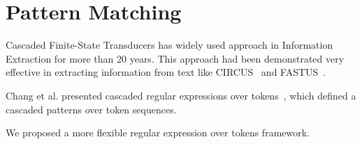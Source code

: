 \section{Pattern Matching}

Cascaded Finite-State Transducers has widely used approach in Information Extraction for more than 20 years. This approach had been demonstrated   very effective in extracting information from text like CIRCUS~\cite{lehnert1991university} and FASTUS~\cite{hobbs199713}.  

Chang et al. presented cascaded regular expressions over tokens~\cite{chang2014tokensregex}, which defined a cascaded patterns over token sequences.

We proposed a more flexible regular expression over tokens framework.
